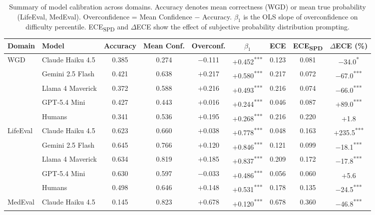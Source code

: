 \begin{table}[t]
\centering
\caption{Summary of model calibration across domains. Accuracy denotes mean correctness (WGD) or mean true probability (LifeEval, MedEval). Overconfidence = Mean Confidence $-$ Accuracy. $\beta_1$ is the OLS slope of overconfidence on difficulty percentile. ECE\textsubscript{SPD} and $\Delta$ECE show the effect of subjective probability distribution prompting.}
\label{tab:rq1_summary}
\begin{tabular}{llccccccc}
\toprule
Domain & Model & Accuracy & Mean Conf. & Overconf. & $\beta_1$ & ECE & ECE\textsubscript{SPD} & $\Delta$ECE (\%) \\
\midrule
\multirow{5}{*}{WGD}
 & Claude Haiku 4.5     & 0.385 & 0.274 & $-$0.111 & $+$0.452\textsuperscript{***} & 0.123 & 0.081 & $-$34.0\textsuperscript{*} \\
 & Gemini 2.5 Flash     & 0.421 & 0.638 & $+$0.217 & $+$0.580\textsuperscript{***} & 0.217 & 0.072 & $-$67.0\textsuperscript{***} \\
 & Llama 4 Maverick     & 0.372 & 0.588 & $+$0.216 & $+$0.493\textsuperscript{***} & 0.216 & 0.074 & $-$66.0\textsuperscript{***} \\
 & GPT-5.4 Mini         & 0.427 & 0.443 & $+$0.016 & $+$0.244\textsuperscript{***} & 0.046 & 0.087 & $+$89.0\textsuperscript{***} \\
 & Humans               & 0.341 & 0.536 & $+$0.195 & $+$0.268\textsuperscript{***} & 0.216 & 0.220 & $+$1.8\textsuperscript{} \\
\midrule
\multirow{5}{*}{LifeEval}
 & Claude Haiku 4.5     & 0.623 & 0.660 & $+$0.038 & $+$0.778\textsuperscript{***} & 0.048 & 0.163 & $+$235.5\textsuperscript{***} \\
 & Gemini 2.5 Flash     & 0.645 & 0.766 & $+$0.120 & $+$0.846\textsuperscript{***} & 0.121 & 0.099 & $-$18.1\textsuperscript{***} \\
 & Llama 4 Maverick     & 0.634 & 0.819 & $+$0.185 & $+$0.837\textsuperscript{***} & 0.209 & 0.172 & $-$17.8\textsuperscript{***} \\
 & GPT-5.4 Mini         & 0.630 & 0.597 & $-$0.033 & $+$0.486\textsuperscript{***} & 0.056 & 0.060 & $+$5.6\textsuperscript{} \\
 & Humans               & 0.498 & 0.646 & $+$0.148 & $+$0.531\textsuperscript{***} & 0.178 & 0.135 & $-$24.5\textsuperscript{***} \\
\midrule
\multirow{4}{*}{MedEval}
 & Claude Haiku 4.5     & 0.145 & 0.823 & $+$0.678 & $+$0.120\textsuperscript{***} & 0.678 & 0.360 & $-$46.8\textsuperscript{***} \\

\end{tabular}
\end{table}
